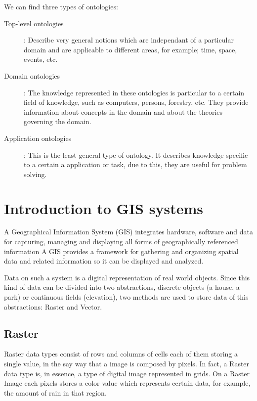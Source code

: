 We can find three types of ontologies:

\begin{description}
	\item[Top-level ontologies]: Describe very general notions which are independant of a particular domain and are applicable to different areas, for example; time, space, events, etc.
	
	\item[Domain ontologies]: The knowledge represented in these ontologies is particular to a certain field of knowledge, such as computers, persons, forestry, etc.	They provide information about concepts in the domain and about the theories governing the domain.
	
	\item[Application ontologies]: This is the least general type of ontology. It describes knowledge specific to a certain a application or task, due to this, they are useful for problem solving.
\end{description}

\section{Introduction to GIS systems}

A Geographical Information System (GIS) integrates hardware, software and data for capturing, managing and displaying all forms of geographically referenced information \cite{esrigis} A GIS provides a framework for gathering and organizing spatial data and related information so it can be displayed and analyzed.

Data on such a system is a digital representation of real world objects. Since this kind of data can be divided into two abstractions, discrete objects (a house, a park) or continuous fields (elevation), two methods are used to store data of this abstractions: Raster and Vector. \cite{giswikigis}

\subsection*{Raster}

Raster data types consist of rows and columns of cells each of them storing a single value, in the say way that a image is composed by pixels. In fact, a Raster data type is, in essence, a type of digital image represented in grids. On a Raster Image each pixels stores a color value which represents certain data, for example, the amount of rain in that region.

